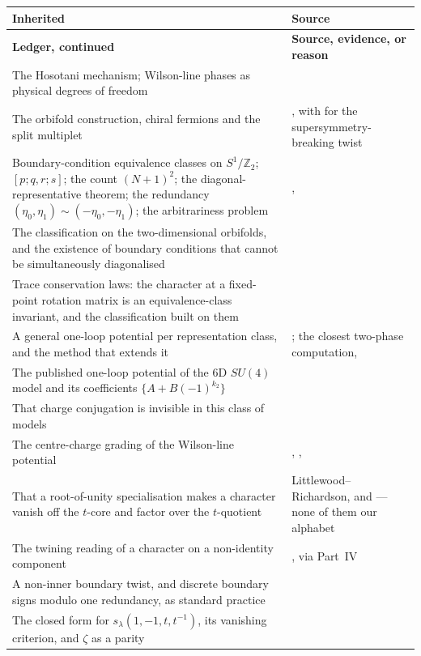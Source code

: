\documentclass[11pt,a4paper]{article}
\newcommand{\ZZ}{\mathbb{Z}}
\newcommand{\su}[1]{SU(#1)}
\begin{document}
\begin{longtable}{p{7.1cm} p{8.1cm}}
\toprule
\rowcolor{hdrblue!14}\textbf{Inherited} & \textbf{Source}\\
\midrule
\endfirsthead
\toprule
\rowcolor{hdrblue!14}\textbf{Ledger, continued} & \textbf{Source, evidence, or reason}\\
\midrule
\endhead
The Hosotani mechanism; Wilson-line phases as physical degrees of freedom & \cite{Hosotani}\\
The orbifold construction, chiral fermions and the split multiplet & \cite{Kawamura,HallNomura}, with
\cite{SS} for the supersymmetry-breaking twist\\
Boundary-condition equivalence classes on $S^1/\ZZ_2$; $[p;q,r;s]$; the count $(N+1)^2$; the
diagonal-representative theorem; the redundancy $(\eta_0,\eta_1)\sim(-\eta_0,-\eta_1)$; the
arbitrariness problem & \cite{HHK}, \cite{HosotaniArb}\\
The classification on the two-dimensional orbifolds, and the existence of boundary conditions that
cannot be simultaneously diagonalised & \cite{KM}\\
Trace conservation laws: the character at a fixed-point rotation matrix is an equivalence-class
invariant, and the classification built on them & \cite{TI1,TI2}\\
A general one-loop potential per representation class, and the method that extends it & \cite{HY};
the closest two-phase computation, \cite{HHHK}\\
The published one-loop potential of the 6D $\su4$ model and its coefficients $\{A+B(-1)^{k_2}\}$ &
\cite{AHMN}\\
That charge conjugation is invisible in this class of models & \cite{KKKY}\\
The centre-charge grading of the Wilson-line potential & \cite{DM}, \cite{RW},
\cite{ArgyresUnsal,Ogilvie}\\
That a root-of-unity specialisation makes a character vanish off the $t$-core and factor over the
$t$-quotient & Littlewood--Richardson, and \cite{Lecouvey,AK,Albion} --- none of them our alphabet\\
The twining reading of a character on a non-identity component & \cite{Jantzen,KLP}, via Part~IV\\
A non-inner boundary twist, and discrete boundary signs modulo one redundancy, as standard practice &
\cite{Cstar}\\
The closed form for $s_\lambda(1,-1,t,t^{-1})$, its vanishing criterion, and $\zeta$ as a parity

\end{longtable}
\end{document}
